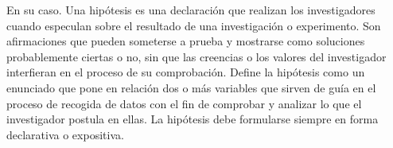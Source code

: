 En su caso.
Una hipótesis es una declaración que realizan los investigadores cuando especulan sobre el resultado de una investigación o experimento.
Son afirmaciones que pueden someterse a prueba y mostrarse como soluciones probablemente ciertas o no, sin que las creencias o los valores del investigador interfieran en el proceso de su comprobación.
Define la hipótesis como un enunciado que pone en relación dos o más variables que sirven de guía en el proceso de recogida de datos con el fin de comprobar y analizar lo que el investigador postula en ellas. La hipótesis debe formularse siempre en forma declarativa o expositiva.